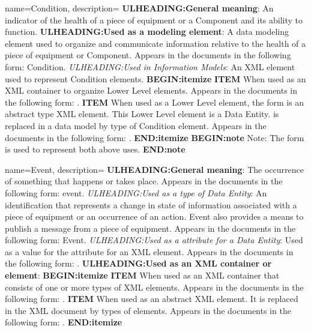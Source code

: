 {
    name={Condition},
	description={
	\textbf{ULHEADING:General meaning}:
	An indicator of the health of a piece of equipment or a \gls{Component} and its ability to function.
	\textbf{ULHEADING:Used as a modeling element}:
	A data modeling element used to organize and communicate information relative to the health of a piece of equipment or \gls{Component}.
	Appears in the documents in the following form: \gls{Condition}.
	\textit{ULHEADING:Used in \gls{Information Models}}:
	An XML element used to represent \gls{Condition} elements.
    \textbf{BEGIN:itemize}
	\textbf{ITEM} When used as an XML container to organize \gls{Lower Level}  elements.
	Appears in the documents in the following form: .
	\textbf{ITEM} When used as a \gls{Lower Level} element, the form  is an abstract type XML element.  This \gls{Lower Level} element is a \gls{Data Entity}.   is replaced in a data model by type of \gls{Condition} element.
	Appears in the documents in the following form: .
	\textbf{END:itemize}
	\textbf{BEGIN:note}
	Note: The form  is used to represent both above uses.
	\textbf{END:note}
}
}

{
    name={Event},
	description={
	\textbf{ULHEADING:General meaning}:
	The occurrence of something that happens or takes place.
	Appears in the documents in the following form: event.
	\textit{ULHEADING:Used as a type of \gls{Data Entity}}:
	An identification that represents a change in state of information associated with a piece of equipment or an occurrence of an action.  Event also provides a means to publish a message from a piece of equipment.
	Appears in the documents in the following form: \gls{Event}.
	\textit{ULHEADING:Used as a  attribute for a \gls{Data Entity}}:
	Used as a value for the  attribute for an XML  element.
	Appears in the documents in the following form: .
	\textbf{ULHEADING:Used as an XML container or element}:
    \textbf{BEGIN:itemize}
	\textbf{ITEM} When used as an XML container that consists of one or more types of  XML elements.
	Appears in the documents in the following form: .
	\textbf{ITEM} When used as an abstract XML element.  It is replaced in the XML document by types of  elements.
	Appears in the documents in the following form: .
    \textbf{END:itemize}
}
}

